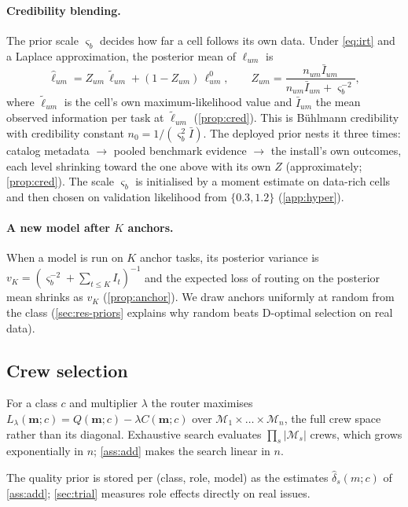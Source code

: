 \documentclass[11pt,a4paper]{article}
\theoremstyle{definition}
\theoremstyle{remark}
\theoremstyle{definition}
\newcommand{\mods}{\mathcal{M}}
\newcommand{\crew}{\mathbf{m}}
\begin{document}
\paragraph{Credibility blending.}
The prior scale $\varsigma_b$ decides how far a cell follows its own data. Under \eqref{eq:irt} and a Laplace approximation, the posterior mean of $\ell_{um}$ is
\begin{equation}
\hat\ell_{um}=Z_{um}\,\tilde\ell_{um}+(1-Z_{um})\,\ell^0_{um},\qquad Z_{um}=\frac{n_{um}\bar I_{um}}{n_{um}\bar I_{um}+\varsigma_b^{-2}},
\label{eq:cred}
\end{equation}
where $\tilde\ell_{um}$ is the cell's own maximum-likelihood value and $\bar I_{um}$ the mean observed information per task at $\tilde\ell_{um}$ (\cref{prop:cred}). This is B\"uhlmann credibility \cite{buhlmann1967,buhlmann2005} with credibility constant $n_0=1/(\varsigma_b^2\bar I)$. The deployed prior nests it three times: catalog metadata $\to$ pooled benchmark evidence $\to$ the install's own outcomes, each level shrinking toward the one above with its own $Z$ (approximately; \cref{prop:cred}). The scale $\varsigma_b$ is initialised by a moment estimate on data-rich cells and then chosen on validation likelihood from $\{0.3,1.2\}$ (\cref{app:hyper}).

\paragraph{A new model after $K$ anchors.}
When a model is run on $K$ anchor tasks, its posterior variance is $v_K=(\varsigma_b^{-2}+\sum_{t\le K}I_t)^{-1}$ and the expected loss of routing on the posterior mean shrinks as $v_K$ (\cref{prop:anchor}). We draw anchors uniformly at random from the class (\cref{sec:res-priors} explains why random beats D-optimal selection on real data).

\subsection{Crew selection}
\label{sec:select}

For a class $c$ and multiplier $\lambda$ the router maximises $L_\lambda(\crew;c)=Q(\crew;c)-\lambda C(\crew;c)$ over $\mods_1\times\dots\times\mods_n$, the full crew space rather than its diagonal. Exhaustive search evaluates $\prod_{s}|\mods_s|$ crews, which grows exponentially in $n$; \cref{ass:add} makes the search linear in $n$.

The quality prior is stored per (class, role, model) as the estimates $\hat\delta_s(m;c)$ of \cref{ass:add}; \cref{sec:trial} measures role effects directly on real issues.
\end{document}
